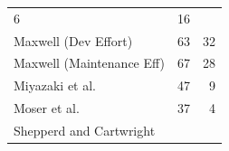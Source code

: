 \documentclass[]{book}
\begin{document}
\begin{longtable}[]{@{}lrr@{}}
\begin{minipage}[t]{0.18\columnwidth}
6\strut
\end{minipage} & \begin{minipage}[t]{0.18\columnwidth}\raggedleft\strut
16\strut
\end{minipage}\tabularnewline
\begin{minipage}[t]{0.44\columnwidth}\raggedright\strut
Maxwell (Dev Effort) \citeyearpar{Maxwell02}\strut
\end{minipage} & \begin{minipage}[t]{0.18\columnwidth}\raggedleft\strut
63\strut
\end{minipage} & \begin{minipage}[t]{0.18\columnwidth}\raggedleft\strut
32\strut
\end{minipage}\tabularnewline
\begin{minipage}[t]{0.44\columnwidth}\raggedright\strut
Maxwell (Maintenance Eff) \citeyearpar{Maxwell02}\strut
\end{minipage} & \begin{minipage}[t]{0.18\columnwidth}\raggedleft\strut
67\strut
\end{minipage} & \begin{minipage}[t]{0.18\columnwidth}\raggedleft\strut
28\strut
\end{minipage}\tabularnewline
\begin{minipage}[t]{0.44\columnwidth}\raggedright\strut
Miyazaki et al. \citeyearpar{Miyazaki94}\strut
\end{minipage} & \begin{minipage}[t]{0.18\columnwidth}\raggedleft\strut
47\strut
\end{minipage} & \begin{minipage}[t]{0.18\columnwidth}\raggedleft\strut
9\strut
\end{minipage}\tabularnewline
\begin{minipage}[t]{0.44\columnwidth}\raggedright\strut
Moser et al. \citeyearpar{Moser1999}\strut
\end{minipage} & \begin{minipage}[t]{0.18\columnwidth}\raggedleft\strut
37\strut
\end{minipage} & \begin{minipage}[t]{0.18\columnwidth}\raggedleft\strut
4\strut
\end{minipage}\tabularnewline
\begin{minipage}[t]{0.44\columnwidth}\raggedright\strut
Shepperd and Cartwright \citep{Shepperd_TSE01}\strut
\end{minipage} & \begin{minipage}[t]{0.18\columnwidth}\raggedleft\strut

\end{minipage}
\end{longtable}
\end{document}
